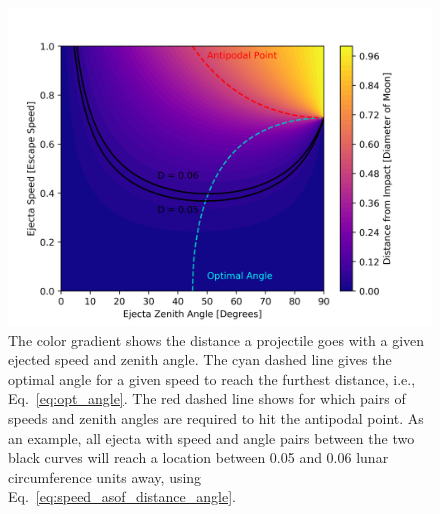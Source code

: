 \documentclass{hitec}
\numberwithin{equation}{section}
\begin{document}
\begin{figure}[h!]
	\centering
	\includegraphics[scale=0.85]{Distance_vs_EjectaSpeed_and_ZenithAngle.png}
	\caption{The color gradient shows the distance a projectile goes with a given ejected speed and zenith angle. The cyan dashed line gives the optimal angle for a given speed to reach the furthest distance, i.e., Eq.\ \eqref{eq:opt_angle}. The red dashed line shows for which pairs of speeds and zenith angles are required to hit the antipodal point. As an example, all ejecta with speed and angle pairs between the two black curves will reach a location between 0.05 and 0.06 lunar circumference units away, using Eq.~\eqref{eq:speed_asof_distance_angle}.}\label{fig:Distance_vs_EjectaSpeed_and_ZenithAngle}
\end{figure}
\end{document}
